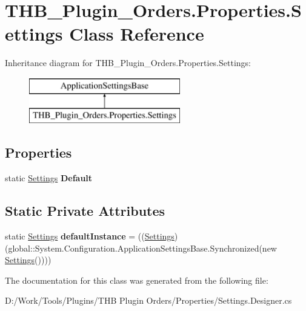 \hypertarget{class_t_h_b___plugin___orders_1_1_properties_1_1_settings}{}\section{T\+H\+B\+\_\+\+Plugin\+\_\+\+Orders.\+Properties.\+Settings Class Reference}
\label{class_t_h_b___plugin___orders_1_1_properties_1_1_settings}
Inheritance diagram for T\+H\+B\+\_\+\+Plugin\+\_\+\+Orders.\+Properties.\+Settings\+:\begin{figure}[H]
\begin{center}
\leavevmode
\includegraphics[height=2.000000cm]{dd/d9e/class_t_h_b___plugin___orders_1_1_properties_1_1_settings}
\end{center}
\end{figure}
\subsection*{Properties}
\begin{DoxyCompactItemize}
\item 
\mbox{\label{class_t_h_b___plugin___orders_1_1_properties_1_1_settings_aa9bb1b48c0521b2a4e7d2d390dccd7ed}} 
static \mbox{\hyperlink{class_t_h_b___plugin___orders_1_1_properties_1_1_settings}{Settings}} {\bfseries Default}
\end{DoxyCompactItemize}
\subsection*{Static Private Attributes}
\begin{DoxyCompactItemize}
\item 
\mbox{\label{class_t_h_b___plugin___orders_1_1_properties_1_1_settings_af1617d6bc9802134b5f147a6eaa63627}} 
static \mbox{\hyperlink{class_t_h_b___plugin___orders_1_1_properties_1_1_settings}{Settings}} {\bfseries default\+Instance} = ((\mbox{\hyperlink{class_t_h_b___plugin___orders_1_1_properties_1_1_settings}{Settings}})(global\+::\+System.\+Configuration.\+Application\+Settings\+Base.\+Synchronized(new \mbox{\hyperlink{class_t_h_b___plugin___orders_1_1_properties_1_1_settings}{Settings}}())))
\end{DoxyCompactItemize}


The documentation for this class was generated from the following file\+:\begin{DoxyCompactItemize}
\item 
D\+:/\+Work/\+Tools/\+Plugins/\+T\+H\+B Plugin Orders/\+Properties/Settings.\+Designer.\+cs\end{DoxyCompactItemize}
